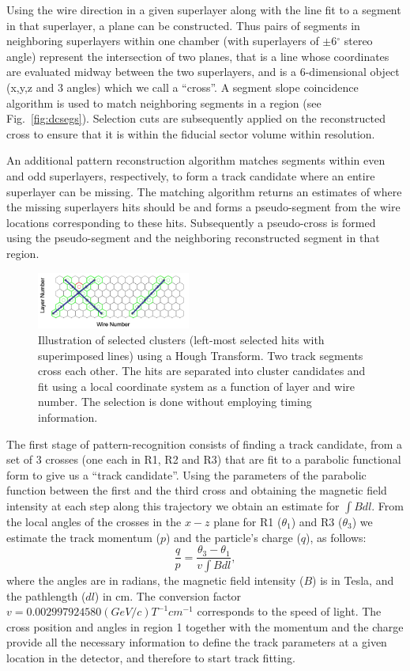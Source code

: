 Using the wire direction in a given superlayer along with the line fit to a segment in that superlayer, a plane can be constructed.
Thus pairs of segments in
neighboring superlayers within one chamber (with superlayers of $\pm$6$^\circ$ stereo angle) represent the
intersection of two planes, that is a line whose coordinates are evaluated midway between the two
superlayers, and is a 6-dimensional object (x,y,z and 3 angles) which we call a ``cross''.
A segment slope coincidence algorithm is used to match neighboring segments in a region (see
Fig.~\ref{fig:dcsegs}).  Selection cuts are subsequently applied on the
reconstructed cross to ensure that it is within the fiducial sector volume within resolution.

An additional  pattern reconstruction algorithm  matches segments within even and odd superlayers, respectively, to form
a track candidate where an entire superlayer can be missing.  The matching algorithm returns an estimates of where the missing
superlayers hits should be and forms a pseudo-segment from the wire locations corresponding to these hits.  Subsequently
a pseudo-cross is formed using the pseudo-segment and the neighboring reconstructed segment in that region.

\begin{figure}
\includegraphics[width=0.45\textwidth]{pics/dcPattern14.png}
\caption{
Illustration of selected clusters (left-most selected hits with superimposed lines) using a Hough Transform.  Two track segments cross each other.  The hits are separated into cluster candidates and fit using a local coordinate system as a function of layer and wire number.  The selection is done without employing timing information. 
}
\label{fig:hough}
\end{figure}
The first stage of
pattern-recognition consists of finding a track candidate, from a set of 3 crosses (one each in R1, R2 and R3) that
are fit to a parabolic functional form to give us a ``track candidate''.
Using the parameters of the parabolic function between the first and the third cross and obtaining the magnetic field
intensity at each step along this trajectory we obtain an estimate for $\int B dl$.
From the local angles of the crosses in the $x-z$ plane for R1 ($\theta_1$) and R3 ($\theta_3$) we estimate the track momentum ($p$)
and the particle's charge ($q$),
as follows:
\begin{equation}\frac{q}{p} = \frac{\theta_3 - \theta_1}{v\int{B dl}},\end{equation} where the angles are in radians, the magnetic field
intensity ($B$) is in Tesla, and the pathlength ($dl$) in cm.
The conversion factor  $v = 0.002997924580 (GeV/c) T^{-1} cm^{-1}$  corresponds to the speed of light.
The cross position and angles in region 1 together with the
momentum and the charge provide all the necessary information to define the track parameters at a given location in the detector,
and therefore to start track fitting.

